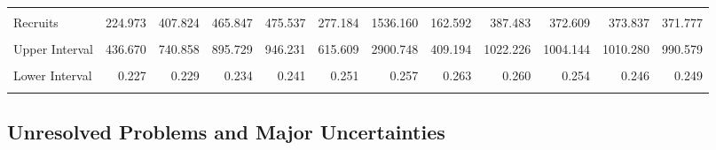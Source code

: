 \documentclass[11pt,
  english,
  a4paper,
]{article}
\begin{document}
\begin{table}[H]
{\begin{tabular}[t]{lrrrrrrrrrrr}
\cellcolor{gray!6}{Upper Interval} & \cellcolor{gray!6}{619.944} & \cellcolor{gray!6}{625.907} & \cellcolor{gray!6}{635.564} & \cellcolor{gray!6}{650.754} & \cellcolor{gray!6}{670.395} & \cellcolor{gray!6}{685.700} & \cellcolor{gray!6}{701.302} & \cellcolor{gray!6}{705.470} & \cellcolor{gray!6}{706.126} & \cellcolor{gray!6}{703.979} & \cellcolor{gray!6}{715.650}\\
Recruits & 224.973 & 407.824 & 465.847 & 475.537 & 277.184 & 1536.160 & 162.592 & 387.483 & 372.609 & 373.837 & 371.777\\
\addlinespace
\cellcolor{gray!6}{Lower Interval} & \cellcolor{gray!6}{115.906} & \cellcolor{gray!6}{224.497} & \cellcolor{gray!6}{242.276} & \cellcolor{gray!6}{238.986} & \cellcolor{gray!6}{124.805} & \cellcolor{gray!6}{813.510} & \cellcolor{gray!6}{64.605} & \cellcolor{gray!6}{146.879} & \cellcolor{gray!6}{138.265} & \cellcolor{gray!6}{138.332} & \cellcolor{gray!6}{139.533}\\
Upper Interval & 436.670 & 740.858 & 895.729 & 946.231 & 615.609 & 2900.748 & 409.194 & 1022.226 & 1004.144 & 1010.280 & 990.579\\
\cellcolor{gray!6}{Fraction Unfished} & \cellcolor{gray!6}{0.377} & \cellcolor{gray!6}{0.380} & \cellcolor{gray!6}{0.386} & \cellcolor{gray!6}{0.396} & \cellcolor{gray!6}{0.410} & \cellcolor{gray!6}{0.419} & \cellcolor{gray!6}{0.428} & \cellcolor{gray!6}{0.428} & \cellcolor{gray!6}{0.426} & \cellcolor{gray!6}{0.421} & \cellcolor{gray!6}{0.427}\\
Lower Interval & 0.227 & 0.229 & 0.234 & 0.241 & 0.251 & 0.257 & 0.263 & 0.260 & 0.254 & 0.246 & 0.249\\
\cellcolor{gray!6}{Upper Interval} & \cellcolor{gray!6}{0.527} & \cellcolor{gray!6}{0.531} & \cellcolor{gray!6}{0.539} & \cellcolor{gray!6}{0.552} & \cellcolor{gray!6}{0.568} & \cellcolor{gray!6}{0.581} & \cellcolor{gray!6}{0.594} & \cellcolor{gray!6}{0.597} & \cellcolor{gray!6}{0.598} & \cellcolor{gray!6}{0.596} & \cellcolor{gray!6}{0.606}\\
\bottomrule
\end{tabular}}
\end{table}

\FloatBarrier


\hypertarget{unresolved-problems-and-major-uncertainties}{%
\subsection*{Unresolved Problems and Major Uncertainties}\label{unresolved-problems-and-major-uncertainties}}
\end{document}

